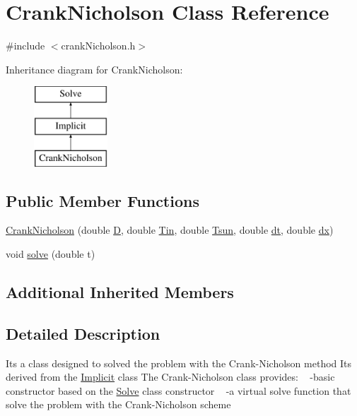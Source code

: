 \hypertarget{class_crank_nicholson}{}\section{Crank\+Nicholson Class Reference}
\label{class_crank_nicholson}


{\ttfamily \#include $<$crank\+Nicholson.\+h$>$}

Inheritance diagram for Crank\+Nicholson\+:\begin{figure}[H]
\begin{center}
\leavevmode
\includegraphics[height=3.000000cm]{class_crank_nicholson}
\end{center}
\end{figure}
\subsection*{Public Member Functions}
\begin{DoxyCompactItemize}
\item 
\hyperlink{class_crank_nicholson_a77c284d244c4c0aabcd2b7d35efc356e}{Crank\+Nicholson} (double \hyperlink{class_solve_ab6b73352e9bca73bad1b133fc84f008c}{D}, double \hyperlink{class_solve_a324c747af91a26a206d7772853b8655e}{Tin}, double \hyperlink{class_solve_a7145536b49fb1ac4d2f36f800d118616}{Tsun}, double \hyperlink{class_solve_ac1befb9c006f895fb0517e19c412ca57}{dt}, double \hyperlink{class_solve_a21b9b8118f508e079f066d2ce2816dd1}{dx})
\item 
void \hyperlink{class_crank_nicholson_a999d04c6ef97b0794f66584f9192dbee}{solve} (double t)
\end{DoxyCompactItemize}
\subsection*{Additional Inherited Members}


\subsection{Detailed Description}
It\textquotesingle{}s a class designed to solved the problem with the Crank-\/\+Nicholson method It\textquotesingle{}s derived from the \hyperlink{class_implicit}{Implicit} class The Crank-\/\+Nicholson class provides\+: ~\newline
-\/basic constructor based on the \hyperlink{class_solve}{Solve} class constructor ~\newline
-\/a virtual solve function that solve the problem with the Crank-\/\+Nicholson scheme 

